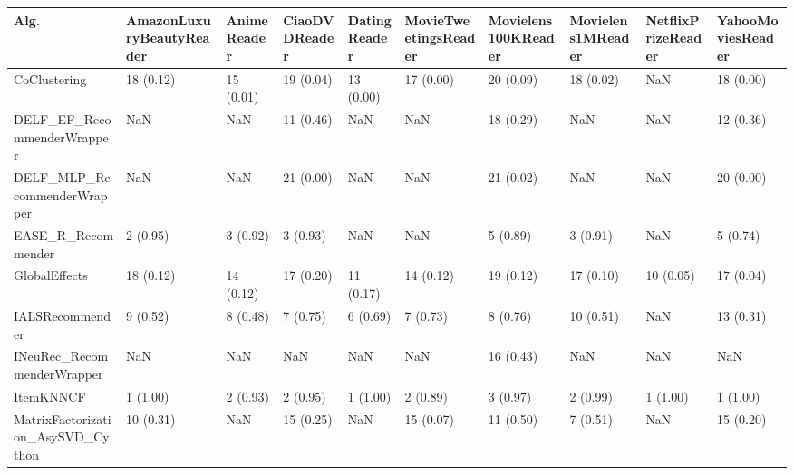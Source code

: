 \begin{tabular}{llllllllll}
\toprule
                               Alg. & AmazonLuxuryBeautyReader & AnimeReader & CiaoDVDReader & DatingReader & MovieTweetingsReader & Movielens100KReader & Movielens1MReader & NetflixPrizeReader & YahooMoviesReader \\
\midrule
                       CoClustering &                18 (0.12) &   15 (0.01) &     19 (0.04) &    13 (0.00) &            17 (0.00) &           20 (0.09) &         18 (0.02) &                NaN &         18 (0.00) \\
         DELF\_EF\_RecommenderWrapper &                      NaN &         NaN &     11 (0.46) &          NaN &                  NaN &           18 (0.29) &               NaN &                NaN &         12 (0.36) \\
        DELF\_MLP\_RecommenderWrapper &                      NaN &         NaN &     21 (0.00) &          NaN &                  NaN &           21 (0.02) &               NaN &                NaN &         20 (0.00) \\
                 EASE\_R\_Recommender &                 2 (0.95) &    3 (0.92) &      3 (0.93) &          NaN &                  NaN &            5 (0.89) &          3 (0.91) &                NaN &          5 (0.74) \\
                      GlobalEffects &                18 (0.12) &   14 (0.12) &     17 (0.20) &    11 (0.17) &            14 (0.12) &           19 (0.12) &         17 (0.10) &          10 (0.05) &         17 (0.04) \\
                    IALSRecommender &                 9 (0.52) &    8 (0.48) &      7 (0.75) &     6 (0.69) &             7 (0.73) &            8 (0.76) &         10 (0.51) &                NaN &         13 (0.31) \\
         INeuRec\_RecommenderWrapper &                      NaN &         NaN &           NaN &          NaN &                  NaN &           16 (0.43) &               NaN &                NaN &               NaN \\
                          ItemKNNCF &                 1 (1.00) &    2 (0.93) &      2 (0.95) &     1 (1.00) &             2 (0.89) &            3 (0.97) &          2 (0.99) &           1 (1.00) &          1 (1.00) \\
  MatrixFactorization\_AsySVD\_Cython &                10 (0.31) &         NaN &     15 (0.25) &          NaN &            15 (0.07) &           11 (0.50) &          7 (0.51) &                NaN &         15 (0.20) \\

\end{tabular}
